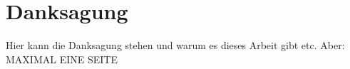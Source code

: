 \thispagestyle{empty} 
\section*{Danksagung}
Hier kann die Danksagung stehen und warum es dieses Arbeit gibt etc.
Aber: MAXIMAL EINE SEITE
\cleardoubleoddpage
